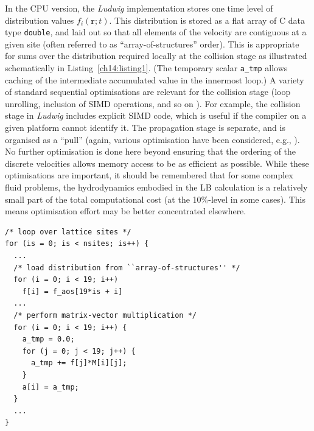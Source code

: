 In the CPU version, the \textit{Ludwig} implementation stores one
time level of distribution values $f_i(\mathbf{r}; t)$. This distribution
is stored as a flat array of C data type \texttt{double}, and laid out so
that all elements of the velocity are contiguous at a given site (often
referred to as ``array-of-structures'' order). This is appropriate
for sums over
the distribution required locally at the collision stage as illustrated
schematically in Listing~\ref{ch14:listing1}. (The temporary scalar
\texttt{a\_tmp} allows caching of the intermediate accumulated value
in the innermost loop.)
A variety of standard sequential optimisations are relevant for the
collision stage (loop unrolling, inclusion of SIMD operations, and
so on \cite{wellein2006}). 
For example, the collision stage in \textit{Ludwig} includes explicit
SIMD code, which is useful if the compiler on a given platform cannot
identify it.
The propagation stage is separate, and is organised as a ``pull''
(again, various optimisation have been considered, e.g., 
\cite{pohl2003,mattila2007,wittmann2012}).
No further optimisation is done
here beyond ensuring that the ordering of the discrete velocities allows
memory access to be as efficient as possible. While these optimisations
are important, it should be remembered that for some complex fluid
problems, the hydrodynamics embodied in the LB calculation is a relatively
small part of the total computational cost (at the 10\%-level in some cases).
This means optimisation effort may be better concentrated elsewhere.

\begin{lstlisting}[float, label=ch14:listing1,
caption = Collision schematic for CPU.]
/* loop over lattice sites */
for (is = 0; is < nsites; is++) {
  ...
  /* load distribution from ``array-of-structures'' */
  for (i = 0; i < 19; i++)    
    f[i] = f_aos[19*is + i]
  ...
  /* perform matrix-vector multiplication */  
  for (i = 0; i < 19; i++) {    
    a_tmp = 0.0;    
    for (j = 0; j < 19; j++) {      
      a_tmp += f[j]*M[i][j];   
    }
    a[i] = a_tmp;
  }
  ...
}
\end{lstlisting}



